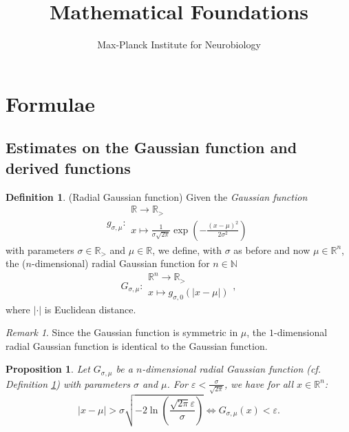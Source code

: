 \documentclass{article}
\title{Mathematical Foundations}
\author{Max-Planck Institute for Neurobiology}
\theoremstyle{plain}
\newtheorem{prp}[lma]{Proposition}
\theoremstyle{remark}
\newtheorem*{rmk}{Remark}
\theoremstyle{definition}
\newtheorem{dfn}[lma]{Definition}
\begin{document}
 \maketitle
 \section{Formulae}
 \subsection{Estimates on the Gaussian function and derived functions}
 \begin{dfn}{(Radial Gaussian function)} \label{radialgaussian}
Given the \emph{Gaussian function}
 \begin{equation*}
g_{\sigma, \mu}: \begin{array}{c} \mathbb{R} \to \mathbb{R}_> \\  x \mapsto \frac{1}{\sigma \sqrt{2 \pi}} \exp \left( - \frac{(x - \mu)^2}{2 \sigma^2} \right) \end{array}
 \end{equation*}
 with parameters $\sigma \in \mathbb{R}_>$ and $\mu \in \mathbb{R}$, we define, with $\sigma$ as before and now $\mu \in \mathbb{R}^n$, the ($n$-dimensional) radial Gaussian function for $n \in \mathbb{N}$
 \begin{equation*}
 G_{\sigma, \mu}: \begin{array}{c} \mathbb{R}^n \to \mathbb{R}_> \\ x \mapsto g_{\sigma, 0} ( | x - \mu | ) \end{array},
 \end{equation*}
 where $| \cdot |$ is Euclidean distance.
 \end{dfn}
 \begin{rmk}
 Since the Gaussian function is symmetric in $\mu$, the $1$-dimensional radial Gaussian function is identical to the Gaussian function.
 \end{rmk}
 \begin{prp} Let $G_{\sigma, \mu}$ be a $n$-dimensional radial Gaussian function (cf. Definition \ref{radialgaussian}) with parameters $\sigma$ and $\mu$. For $\varepsilon < \frac{\sigma}{\sqrt{2 \pi}}$, we have for all $x \in \mathbb{R}^n$:
 \begin{equation*}
|x - \mu| > \sigma \sqrt{ - 2 \ln \left( \frac{\sqrt{2 \pi} \varepsilon}{\sigma} \right)} \iff G_{\sigma, \mu}(x) < \varepsilon.
 \end{equation*}
 \end{prp}
\end{document}
